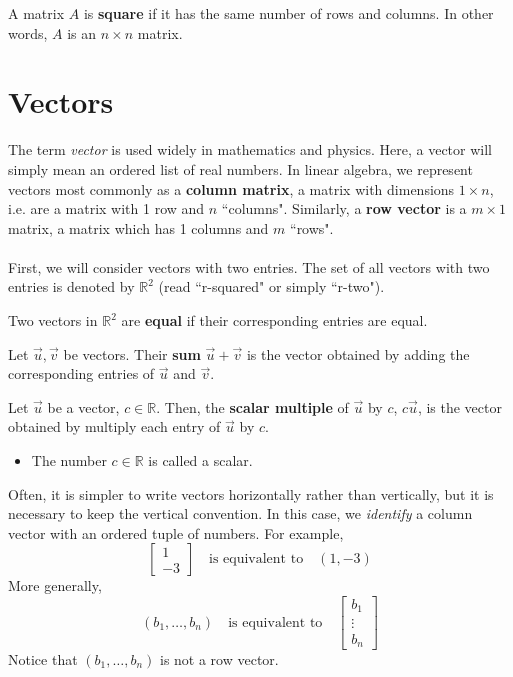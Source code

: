 \documentclass[letterpaper,12pt]{article}
\begin{document}
\begin{definition}
A matrix $A$ is \textbf{square} if it has the same number of rows and columns. In other words, $A$ is an $n \times n$ matrix.
\end{definition}

\section*{Vectors}

The term \textit{vector} is used widely in mathematics and physics. Here, a vector will simply mean an ordered list of real numbers. In linear algebra, we represent vectors most commonly as a \textbf{column matrix}, a matrix with dimensions $1 \times n$, i.e. are a matrix with 1 row and $n$ ``columns". Similarly, a \textbf{row vector} is a $m \times 1$ matrix, a matrix which has 1 columns and $m$ ``rows".
\\ \\ First, we will consider vectors with two entries. The set of all vectors with two entries is denoted by $\mathbb{R}^2$ (read ``r-squared" or simply ``r-two").

\begin{definition}
Two vectors in $\mathbb{R}^2$ are \textbf{equal} if their corresponding entries are equal.
\end{definition}

\begin{definition}
Let $\vec{u}, \vec{v}$ be vectors. Their \textbf{sum} $\vec{u} + \vec{v}$ is the vector obtained by adding the corresponding entries of $\vec{u}$ and $\vec{v}$.
\end{definition}

\begin{definition}
Let $\vec{u}$ be a vector, $c \in \mathbb{R}$. Then, the \textbf{scalar multiple} of $\vec{u}$ by $c$, $c\vec{u}$, is the vector obtained by multiply each entry of $\vec{u}$ by $c$.
\begin{itemize}
    \item The number $c \in \mathbb{R}$ is called a scalar.
\end{itemize}
\end{definition}

Often, it is simpler to write vectors horizontally rather than vertically, but it is necessary to keep the vertical convention. In this case, we \textit{identify} a column vector with an ordered tuple of numbers. For example,
\begin{equation*}
    \begin{bmatrix} 1 \\ -3 \end{bmatrix} \quad \text{is equivalent to} \quad (1,-3)
\end{equation*}
More generally,
\begin{equation*}
    (b_1, \dots, b_n) \quad \text{is equivalent to} \quad \begin{bmatrix} b_1 \\ \vdots \\ b_n \end{bmatrix}
\end{equation*}
Notice that $(b_1, \dots, b_n)$ is not a row vector.
\end{document}
